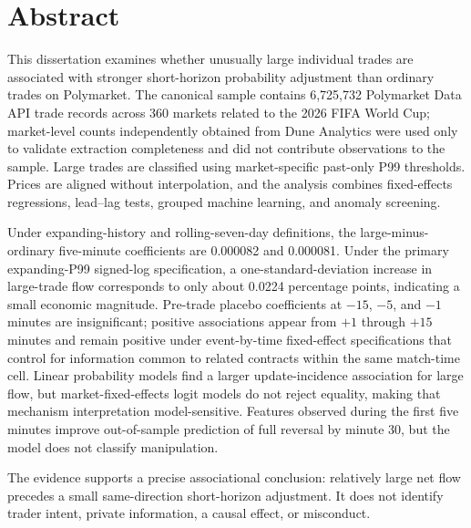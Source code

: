 
\section*{Abstract}

This dissertation examines whether unusually large individual trades are
associated with stronger short-horizon probability adjustment than ordinary
trades on Polymarket. The canonical sample contains 6,725,732 Polymarket Data
API trade records across 360 markets related to the 2026 FIFA World Cup; market-level
counts independently obtained from Dune Analytics were used only to validate
extraction completeness and did not contribute observations to the sample. Large
trades are classified using market-specific past-only P99 thresholds. Prices
are aligned without interpolation, and the analysis combines fixed-effects
regressions, lead--lag tests, grouped machine learning, and anomaly screening.

Under expanding-history and rolling-seven-day definitions, the
large-minus-ordinary five-minute coefficients are 0.000082 and 0.000081. Under
the primary expanding-P99 signed-log specification, a one-standard-deviation
increase in large-trade flow corresponds to only about 0.0224 percentage points,
indicating a small economic magnitude. Pre-trade placebo coefficients at
$-15$, $-5$, and $-1$ minutes are insignificant; positive associations appear
from $+1$ through $+15$ minutes and remain positive under event-by-time
fixed-effect specifications that control for information common to related
contracts within the same match-time cell. Linear
probability models find a larger update-incidence association for large flow,
but market-fixed-effects logit models do not reject equality, making that
mechanism interpretation model-sensitive. Features observed during the first
five minutes improve out-of-sample prediction of full reversal by minute 30,
but the model does not classify manipulation.

The evidence supports a precise associational conclusion: relatively large net
flow precedes a small same-direction short-horizon adjustment. It does not
identify trader intent, private information, a causal effect, or misconduct.

